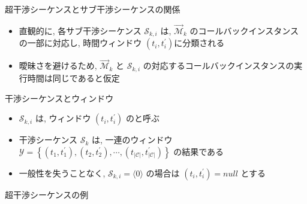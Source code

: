\begin{frame}{超干渉シーケンスとサブ干渉シーケンスの関係}
    \begin{itemize}
        \item 直観的に, 各サブ干渉シーケンス $\mathcal{S}_{k, i}$ は, $\overrightarrow{\mathcal{M}}_{k}$ のコールバックインスタンスの一部に対応し, 時間ウィンドウ $\left(t_{i}, t_{i}^{\prime}\right)$に分類される
        \item 曖昧さを避けるため, $\overrightarrow{\mathcal{M}}_{k}$ と $\mathcal{S}_{k, i}$ の対応するコールバックインスタンスの実行時間は同じであると仮定
    \end{itemize}
\end{frame}

\begin{frame}{干渉シーケンスとウィンドウ}
    \begin{itemize}
        \item $\mathcal{S}_{k, i}$ は, ウィンドウ $\left(t_{i}, t_{i}^{\prime}\right)$ のと呼ぶ
        \item 干渉シーケンス $\mathcal{S}_{k}$ は, 一連のウィンドウ $\mathcal{Y}=\left\{\left(t_{1}, t_{1}^{\prime}\right),\left(t_{2}, t_{2}^{\prime}\right), \cdots,\left(t_{|\mathcal{C}|}, t_{|\mathcal{C}|}^{\prime}\right)\right\}$ の結果である
        \item 一般性を失うことなく, $\mathcal{S}_{k, i}=\langle 0\rangle$ の場合は $\left(t_{i}, t_{i}^{\prime}\right)=n u l l$ とする
    \end{itemize}
\end{frame}

\begin{frame}{超干渉シーケンスの例}
\end{frame}


